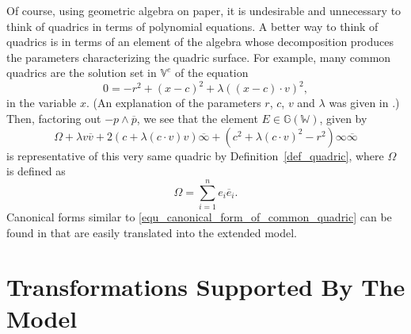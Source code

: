 \documentclass{birkjour}
\theoremstyle{definition}
\theoremstyle{remark}
\numberwithin{equation}{section}
\newcommand{\G}{\mathbb{G}}
\newcommand{\V}{\mathbb{V}}
\newcommand{\W}{\mathbb{W}}
\newcommand{\nvai}{\infty}
\newcommand{\nvaib}{\overline{\infty}}
\begin{document}
Of course, using geometric algebra on paper, it is undesirable and unnecessary to think of
quadrics in terms of polynomial equations.  A better way to think of quadrics is in terms
of an element of the algebra whose decomposition
produces the parameters characterizing the quadric surface.  For example, many common
quadrics are the solution set in $\V^e$ of the equation
\begin{equation}
0 = -r^2 + (x-c)^2 + \lambda((x-c)\cdot v)^2,
\end{equation}
in the variable $x$.  (An explanation of the parameters $r$, $c$, $v$ and $\lambda$
was given in \cite{Parkin12}.)  Then, factoring out $-p\wedge\overline{p}$, we see that
the element $E\in\G(\W)$, given by
\begin{equation}\label{equ_canonical_form_of_common_quadric}
\Omega + \lambda v\overline{v}+2(c+\lambda(c\cdot v)v)\nvaib+
(c^2+\lambda (c\cdot v)^2-r^2)\nvai\nvaib
\end{equation}
is representative of this very same quadric by Definition~\ref{def_quadric},
where $\Omega$ is defined as
\begin{equation}
\Omega = \sum_{i=1}^n e_i\overline{e}_i.
\end{equation}
Canonical forms similar to \eqref{equ_canonical_form_of_common_quadric}
can be found in \cite{Parkin12} that are easily translated into the extended model.

\section{Transformations Supported By The Model}
\end{document}
